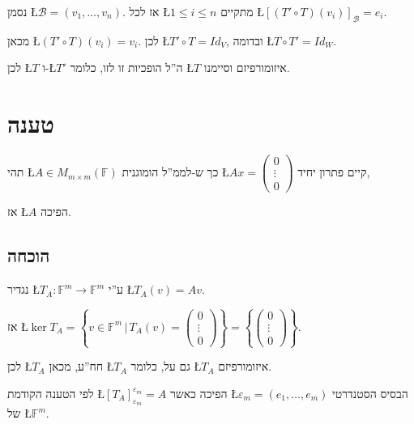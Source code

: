 \documentclass[english,hebrew]{article}
\begin{document}
נסמן \L{$\mathcal{B}=(v_{1},\dots,v_{n})$}. אז לכל \L{$1\leq i\leq n$}
מתקיים \L{$[(T'\circ T)(v_{i})]_{\mathcal{B}}=e_{i}$}.

מכאן \L{$(T'\circ T)(v_{i})=v_{i}$}. לכן \L{$T'\circ T=Id_{V}$},
ובדומה \L{$T\circ T'=Id_{W}$}.

לכן \L{$T$} ו-\L{$T'$} ה\textquotedblright ל הופכיות זו לזו, כלומר
\L{$T$} איזומורפיזם וסיימנו.

\section{טענה}

תהי \L{$A\in M_{m\times m}(\mathbb{F})$} כך ש-לממ\textquotedblright ל
הומוגנית \L{$Ax=\begin{pmatrix}0\\
\vdots\\
0
\end{pmatrix}$} קיים פתרון יחיד,

אז \L{$A$} הפיכה.

\subsection{הוכחה}

נגדיר \L{$T_{A}:\mathbb{F}^{m}\rightarrow\mathbb{F}^{m}$} ע\textquotedblright י
\L{$T_{A}(v)=Av$}.

אז \L{$\ker T_{A}=\left\{ v\in\mathbb{F}^{m}\,|\,T_{A}(v)=\begin{pmatrix}0\\
\vdots\\
0
\end{pmatrix}\right\} =\left\{ \begin{pmatrix}0\\
\vdots\\
0
\end{pmatrix}\right\} $}.

לכן \L{$T_{A}$} חח\textquotedblright ע, מכאן \L{$T_{A}$} גם על,
כלומר \L{$T_{A}$} איזומורפיזם.

לפי הטענה הקודמת \L{$[T_{A}]_{\varepsilon_{m}}^{\varepsilon_{m}}=A$}
הפיכה כאשר \L{$\varepsilon_{m}=(e_{1},\dots,e_{m})$} הבסיס הסטנדרטי
של \L{$\mathbb{F}^{m}$}.

\newpage{}

\noindent{}
\end{document}
